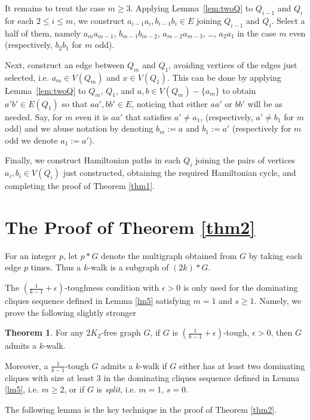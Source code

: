 \documentclass{amsart}
\theoremstyle{definition}
\newtheorem{theorem}{Theorem}
\begin{document}
It remains to treat the case $m\geq 3$.
Applying Lemma~\ref{lem:twoQ} to $Q_{i-1}$ and $Q_i$ for each $2\leq i\leq m$, 
we construct $a_{i-1}a_i, b_{i-1}b_i\in E$ joining $Q_{i-1}$ and $Q_i$.
Select a half of them, namely $a_{m}a_{m-1}$, $b_{m-1}b_{m-2}$, $a_{m-2}a_{m-3}$, \dots,
$a_2a_1$ in the case $m$ even (respectively, $b_2b_1$ for $m$ odd).

Next, construct an edge between $Q_m$ and $Q_1$, avoiding vertices of the edges just
selected, i.e. $a_m\in V(Q_m)$ and $x\in V(Q_1)$. 
This can be done by applying Lemma~\ref{lem:twoQ} to $Q_m$, $Q_1$, 
and $a,b\in V(Q_m)-\{a_m\}$ to obtain $a'b'\in E(Q_1)$ so that $aa',bb'\in E$, 
noticing that either $aa'$ or $bb'$ will be as needed. Say, for $m$ even 
it is $aa'$
that satisfies $a'\neq a_1$, (respectively, $a'\neq b_1$ for $m$ odd)  and we 
abuse notation by denoting $b_m:=a$ and $b_1:=a'$ (respectively for $m$ odd 
we denote $a_1:=a'$).

Finally, we construct Hamiltonian paths in each $Q_i$ joining the pairs of vertices
$a_i,b_i\in V(Q_i)$ just constructed, obtaining the required Hamiltonian cycle, 
and completing the proof of Theorem \ref{thm1}.

\section{The Proof of Theorem \ref{thm2}}

For an integer $p$, let $p*G$ denote the multigraph obtained from $G$ by taking each edge $p$ times. 
Thus a $k$-walk is a subgraph of $(2k)*G$. 


The $(\frac{1}{k-1}+\epsilon)$-toughness condition with $\epsilon>0$ 
is only used for the dominating cliques sequence defined in Lemma \ref{lm5} 
satisfying $m=1$ and $s\geq 1$. Namely, we prove the following
slightly stronger
\begin{theorem}\label{opt}
For any $2K_2$-free graph $G$, if $G$ is $(\frac{1}{k-1}+\epsilon)$-tough, 
$\epsilon>0$, then $G$ admits a $k$-walk. 

Moreover, a $\frac{1}{k-1}$-tough $G$ admits a $k$-walk if $G$ either has at
least two dominating cliques with size at least 3 in the dominating cliques
sequence defined in Lemma \ref{lm5}, i.e. $m\ge2$, or if $G$ is {\em split},
i.e. $m=1$, $s=0$.  
\end{theorem}




The following lemma is the key technique in the proof of Theorem \ref{thm2}.
\end{document}
